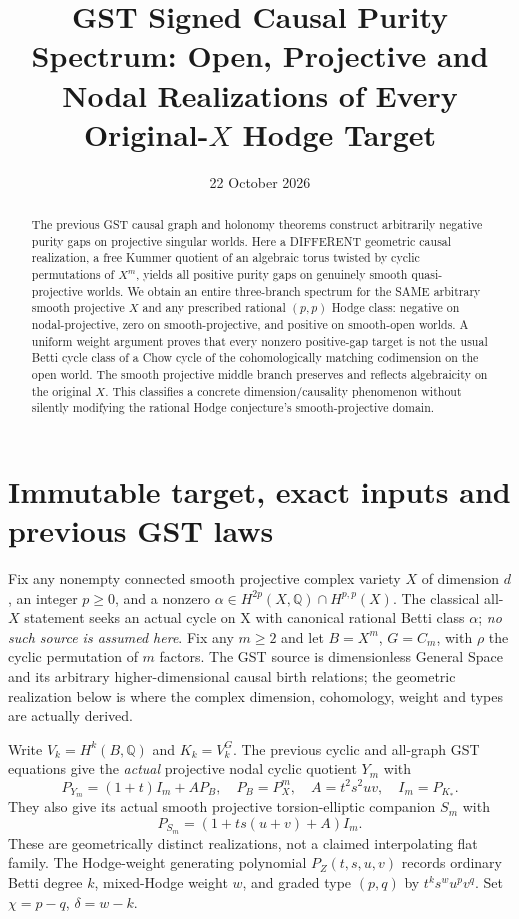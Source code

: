 \documentclass[11pt]{article}
\title{GST Signed Causal Purity Spectrum: Open, Projective and Nodal
Realizations of Every Original-$X$ Hodge Target}
\date{22 October 2026}
\begin{document}
\maketitle
\begin{abstract}
The previous GST causal graph and holonomy theorems construct arbitrarily
negative purity gaps on projective singular worlds. Here a DIFFERENT
geometric causal realization, a free Kummer quotient of an algebraic
torus twisted by cyclic permutations of $X^m$, yields all positive
purity gaps on genuinely smooth quasi-projective worlds. We obtain
an entire three-branch spectrum for the SAME arbitrary smooth
projective $X$ and any prescribed rational $(p,p)$ Hodge class:
negative on nodal-projective, zero on smooth-projective, and positive
on smooth-open worlds. A uniform weight argument proves that every
nonzero positive-gap target is not the usual Betti cycle class of a
Chow cycle of the cohomologically matching codimension on the open
world. The smooth projective middle branch preserves and reflects
algebraicity on the original $X$. This classifies a concrete
dimension/causality phenomenon without silently modifying the
rational Hodge conjecture's smooth-projective domain.
\end{abstract}

\section{Immutable target, exact inputs and previous GST laws}
Fix any nonempty connected smooth projective complex variety $X$
of dimension $d$, an integer $p\geq0$, and a nonzero
$\alpha\in H^{2p}(X,\mathbb Q)\cap H^{p,p}(X)$.
The classical all-$X$ statement seeks an actual cycle on X with
canonical rational Betti class $\alpha$; \emph{no such source is
assumed here}. Fix any $m\geq2$ and let
$B=X^m$, $G=C_m$, with $\rho$ the cyclic permutation of $m$
factors.  The GST source is dimensionless General Space and its
arbitrary higher-dimensional causal birth relations; the geometric
realization below is where the complex dimension, cohomology, weight
and types are actually derived.

Write $V_k=H^k(B,\mathbb Q)$ and
$K_k=V_k^G$. The previous cyclic and all-graph GST equations
give the \emph{actual} projective nodal cyclic quotient $Y_m$
with
\[
 P_{Y_m}=(1+t)I_m+A P_B,\quad
 P_B=P_X^m,\quad A=t^2s^2uv,\quad
 I_m=P_{K_*}.
 \tag{1}
\]
They also give its actual smooth projective torsion-elliptic
companion $S_m$ with
\[
 P_{S_m}=(1+ts(u+v)+A)I_m.
 \tag{2}
\]
These are geometrically distinct realizations, not a claimed
interpolating flat family. The Hodge-weight generating polynomial
$P_Z(t,s,u,v)$ records ordinary Betti degree $k$, mixed-Hodge
weight $w$, and graded type $(p,q)$ by $t^ks^wu^pv^q$.
Set $\chi=p-q$, $\delta=w-k$.
\end{document}
